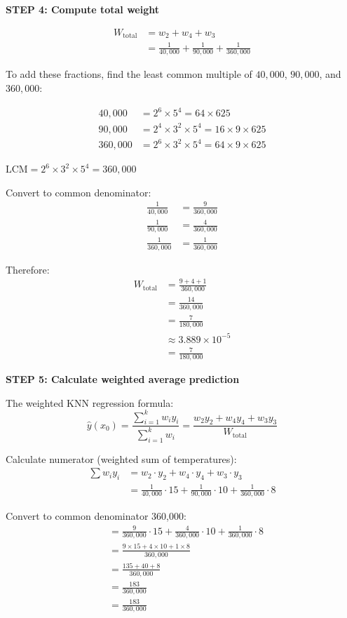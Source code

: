 \documentclass[12pt]{article}
\begin{document}
\begin{solution}
\textbf{STEP 4: Compute total weight}

\begin{align*}
W_{\text{total}} &= w_2 + w_4 + w_3 \\
&= \frac{1}{40{,}000} + \frac{1}{90{,}000} + \frac{1}{360{,}000}
\end{align*}

To add these fractions, find the least common multiple of \(40{,}000\), \(90{,}000\), and \(360{,}000\):

\begin{align*}
40{,}000 &= 2^6 \times 5^4 = 64 \times 625 \\
90{,}000 &= 2^4 \times 3^2 \times 5^4 = 16 \times 9 \times 625 \\
360{,}000 &= 2^6 \times 3^2 \times 5^4 = 64 \times 9 \times 625
\end{align*}

\(\text{LCM} = 2^6 \times 3^2 \times 5^4 = 360{,}000\)

Convert to common denominator:
\begin{align*}
\frac{1}{40{,}000} &= \frac{9}{360{,}000} \\
\frac{1}{90{,}000} &= \frac{4}{360{,}000} \\
\frac{1}{360{,}000} &= \frac{1}{360{,}000}
\end{align*}

Therefore:
\begin{align*}
W_{\text{total}} &= \frac{9 + 4 + 1}{360{,}000} \\
&= \frac{14}{360{,}000} \\
&= \frac{7}{180{,}000} \\
&\approx 3.889 \times 10^{-5} \\
&= \boxed{\frac{7}{180{,}000}}
\end{align*}

\textbf{STEP 5: Calculate weighted average prediction}

The weighted KNN regression formula:
\[
\hat{y}(x_0) = \frac{\sum_{i=1}^k w_i y_i}{\sum_{i=1}^k w_i} = \frac{w_2 y_2 + w_4 y_4 + w_3 y_3}{W_{\text{total}}}
\]

Calculate numerator (weighted sum of temperatures):
\begin{align*}
\sum w_i y_i &= w_2 \cdot y_2 + w_4 \cdot y_4 + w_3 \cdot y_3 \\
&= \frac{1}{40{,}000} \cdot 15 + \frac{1}{90{,}000} \cdot 10 + \frac{1}{360{,}000} \cdot 8
\end{align*}

Convert to common denominator 360,000:
\begin{align*}
&= \frac{9}{360{,}000} \cdot 15 + \frac{4}{360{,}000} \cdot 10 + \frac{1}{360{,}000} \cdot 8 \\
&= \frac{9 \times 15 + 4 \times 10 + 1 \times 8}{360{,}000} \\
&= \frac{135 + 40 + 8}{360{,}000} \\
&= \frac{183}{360{,}000} \\
&= \boxed{\frac{183}{360{,}000}}
\end{align*}


\end{solution}
\end{document}
